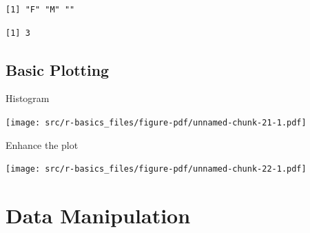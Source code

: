 \documentclass[
  letterpaper,
  DIV=11,
  numbers=noendperiod]{scrreprt}
\newenvironment{Shaded}{\begin{snugshade}}{\end{snugshade}}
\newcommand{\CommentTok}[1]{\textcolor[rgb]{0.37,0.37,0.37}{#1}}
\newcommand{\DecValTok}[1]{\textcolor[rgb]{0.68,0.00,0.00}{#1}}
\newcommand{\FunctionTok}[1]{\textcolor[rgb]{0.28,0.35,0.67}{#1}}
\newcommand{\NormalTok}[1]{\textcolor[rgb]{0.00,0.23,0.31}{#1}}
\newcommand{\OtherTok}[1]{\textcolor[rgb]{0.00,0.23,0.31}{#1}}
\newcommand{\SpecialCharTok}[1]{\textcolor[rgb]{0.37,0.37,0.37}{#1}}
\newcommand{\StringTok}[1]{\textcolor[rgb]{0.13,0.47,0.30}{#1}}
\begin{document}
\begin{verbatim}
[1] "F" "M" "" 
\end{verbatim}

\begin{Shaded}
\end{Shaded}

\begin{verbatim}
[1] 3
\end{verbatim}

\subsection{Basic Plotting}\label{basic-plotting}

Histogram

\begin{Shaded}
\end{Shaded}

\texttt{[image: src/r-basics\_files/figure-pdf/unnamed-chunk-21-1.pdf]}

Enhance the plot

\begin{Shaded}
\end{Shaded}

\texttt{[image: src/r-basics\_files/figure-pdf/unnamed-chunk-22-1.pdf]}

\section{Data Manipulation}\label{data-manipulation}
\end{document}
